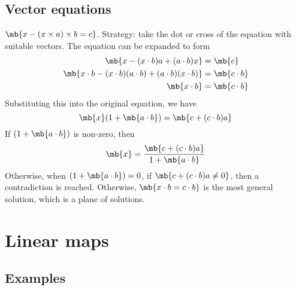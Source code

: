 \documentclass[a4paper]{article}
\begin{document}
\subsection{Vector equations}
\begin{eg}
  $\mb{x - (x\times a)\times b = c}$. Strategy: take the dot or cross of the equation with suitable vectors. The equation can be expanded to form
  \begin{align*}
    \mb{x - (x\cdot b)a + (a\cdot b)x} &= \mb{c}\\
    \mb{x\cdot b - (x\cdot b)(a\cdot b) + (a\cdot b)(x\cdot b)} &= \mb{c\cdot b}\\
    \mb{x\cdot b} &= \mb{c\cdot b}
  \end{align*}
  Substituting this into the original equation, we have
  \[
  \mb{x}(1 + \mb{a\cdot b}) = \mb{c + (c\cdot b)a}
  \]
  If $(1 + \mb{a \cdot b})$ is non-zero, then
  \[
  \mb{x} = \frac{\mb{c + (c\cdot b)a}}{1 + \mb{a\cdot b}}
  \]
  Otherwise, when $(1 + \mb{a\cdot b}) = 0$, if $\mb{c + (c\cdot b)a \not= 0}$, then a contradiction is reached. Otherwise, $\mb{x\cdot b = c\cdot b}$ is the most general solution, which is a plane of solutions.
\end{eg}

\section{Linear maps}
\subsection{Examples}
\end{document}
